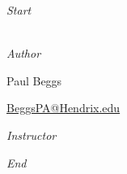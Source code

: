 \documentclass[12pt, oneside]{book}
\begin{document}
\begin{titlepage}
\begin{center}
        \vspace*{1\baselineskip}

        {\LARGE \textbf{\cussubtitle}}

        \begin{large}
            \vspace*{2\baselineskip}

            \textit{Start}  \\[1ex]
            {\scshape \startdate} \\[0.3\baselineskip] %

            \vspace*{1\baselineskip}

            \emph{Author} \\[1ex]
            {\Large Paul Beggs \\ \par} %
            {\href{mailto:BeggsPA@Hendrix.edu}{{BeggsPA@Hendrix.edu}}}\\ %

            \vspace*{1\baselineskip}

            \textit{Instructor} \\[1ex] %
            \professor

            \vspace*{1\baselineskip}

            \textit{End}\\[1ex]
            {\scshape  \customenddate} \\[0.3\baselineskip] %

            \thispagestyle{empty}

        \end{large}
    \end{center}
\end{titlepage}
\pagebreak






\end{document}
